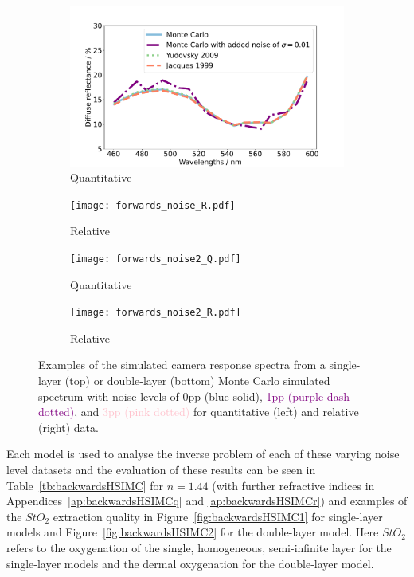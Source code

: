 \begin{figure}[h!]
    \centering
    \begin{subfigure}{0.49\textwidth}
        \includegraphics[width=\textwidth]{forwards_noise_Q.pdf}
        \caption{Quantitative}
        \label{fig:egforwardsnoiseMCQ}
    \end{subfigure}
    \begin{subfigure}{0.49\textwidth}
        \texttt{[image: forwards\_noise\_R.pdf]}
        \caption{Relative}
        \label{fig:egforwardsnoiseMCR}
    \end{subfigure}
    \begin{subfigure}{0.49\textwidth}
        \texttt{[image: forwards\_noise2\_Q.pdf]}
        \caption{Quantitative}
        \label{fig:egforwards2noiseMCQ}
    \end{subfigure}
    \begin{subfigure}{0.49\textwidth}
        \texttt{[image: forwards\_noise2\_R.pdf]}
        \caption{Relative}
        \label{fig:egforwards2noiseMCR}
    \end{subfigure}
    \caption{Examples of the simulated camera response spectra from a single-layer (top) or double-layer (bottom) Monte Carlo simulated spectrum with noise levels of \textcolor{MyBlue}{0pp (blue solid)}, \textcolor{purple}{1pp (purple dash-dotted)}, and \textcolor{pink}{3pp (pink dotted)} for quantitative (left) and relative (right) data.}
    \label{fig:forwardsMCnoise}
\end{figure}

Each model is used to analyse the inverse problem of each of these varying noise level datasets and the evaluation of these results can be seen in Table~\ref{tb:backwardsHSIMC} for $n=1.44$ (with further refractive indices in Appendices~\ref{ap:backwardsHSIMCq} and \ref{ap:backwardsHSIMCr}) and examples of the $StO_2$ extraction quality in Figure~\ref{fig:backwardsHSIMC1} for single-layer models and Figure~\ref{fig:backwardsHSIMC2} for the double-layer model. Here $StO_2$ refers to the oxygenation of the single, homogeneous, semi-infinite layer for the single-layer models and the dermal oxygenation for the double-layer model. 

